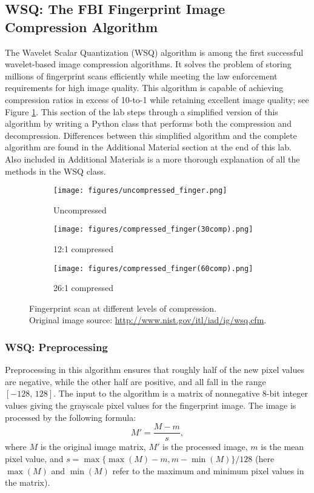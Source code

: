 
\subsection*{WSQ: The FBI Fingerprint Image Compression Algorithm} %

The Wavelet Scalar Quantization (WSQ) algorithm is among the first successful wavelet-based image compression algorithms.
It solves the problem of storing millions of fingerprint scans efficiently while meeting the law enforcement requirements for high image quality.
This algorithm is capable of achieving compression ratios in excess of 10-to-1 while retaining excellent image quality; see Figure \ref{fig:finger_compression}.
This section of the lab steps through a simplified version of this algorithm by writing a Python class that performs both the compression and decompression.
Differences between this simplified algorithm and the complete algorithm are found in the Additional Material section at the end of this lab.
Also included in Additional Materials is a more thorough explanation of all the methods in the WSQ class.

\begin{figure}[H]
\centering
\begin{subfigure}{.32\textwidth}
  \centering
  \texttt{[image: figures/uncompressed\_finger.png]}
  \caption{Uncompressed}
\end{subfigure}%
\begin{subfigure}{.32\textwidth}
  \centering
  \texttt{[image: figures/compressed\_finger(30comp).png]}
  \caption{12:1 compressed}
\end{subfigure}%
\begin{subfigure}{.32\textwidth}
  \centering
  \texttt{[image: figures/compressed\_finger(60comp).png]}
  \caption{26:1 compressed}
\end{subfigure}
\caption{Fingerprint scan at different levels of compression.\\
Original image source: \url{http://www.nist.gov/itl/iad/ig/wsq.cfm}.
}
\label{fig:finger_compression}
\end{figure}

\subsubsection*{WSQ: Preprocessing}
Preprocessing in this algorithm ensures that roughly half of the new pixel values are negative, while the other half are positive, and all fall in the range $[-128,\,128]$.
The input to the algorithm is a matrix of nonnegative 8-bit integer values giving the grayscale pixel values for the fingerprint image.
The image is processed by the following formula:
\[
M' = \frac{M-m}{s},
\]
where $M$ is the original image matrix, $M'$ is the processed image, $m$ is the mean pixel value, and $s = \max\{\max(M) - m, m - \min(M)\}/128$
(here $\max(M)$ and $\min(M)$ refer to the maximum and minimum pixel values in the matrix).



